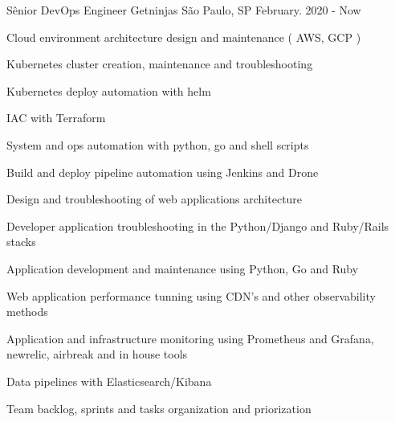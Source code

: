 

\begin{cventries}
\cventry
{Sênior DevOps Engineer} %
{Getninjas} %
{São Paulo, SP} %
{February. 2020 - Now} %
{
  \begin{cvitems} %
   \item {Cloud environment architecture design and maintenance  ( AWS, GCP ) }
   \item {Kubernetes cluster creation, maintenance and troubleshooting}
   \item {Kubernetes deploy automation with helm}
   \item {IAC with Terraform}
   \item {System and ops automation with python, go and shell scripts}
   \item {Build and deploy pipeline automation using Jenkins and Drone}
   \item {Design and troubleshooting of web applications architecture}
   \item {Developer application troubleshooting in the Python/Django and Ruby/Rails stacks}
   \item {Application development and maintenance using Python, Go and Ruby}
   \item {Web application performance tunning using CDN's and other observability methods}
   \item {Application and infrastructure monitoring using Prometheus and Grafana, newrelic, airbreak and in house tools}
   \item {Data pipelines with Elasticsearch/Kibana}
   \item {Team backlog, sprints and tasks organization and priorization}
  \end{cvitems}
}


\end{cventries}
